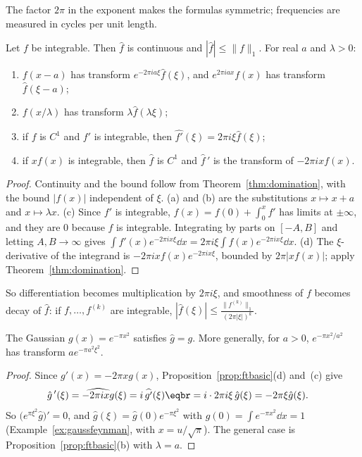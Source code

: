 The factor $2\pi$ in the exponent makes the formulas symmetric; frequencies are measured in cycles per unit length.

\begin{proposition}\label{prop:ftbasic}
Let $f$ be integrable. Then $\hat f$ is continuous and $|\hat f|\le\|f\|_1$. For real $a$ and $\lambda>0$:
\begin{enumerate}[label=(\alph*)]
\item $f(x-a)$ has transform $e^{-2\pi ia\xi}\hat f(\xi)$, and $e^{2\pi iax}f(x)$ has transform $\hat f(\xi-a)$;
\item $f(x/\lambda)$ has transform $\lambda\hat f(\lambda\xi)$;
\item if $f$ is $C^1$ and $f'$ is integrable, then $\widehat{f'}(\xi)=2\pi i\xi\hat f(\xi)$;
\item if $xf(x)$ is integrable, then $\hat f$ is $C^1$ and $\hat f\,'$ is the transform of $-2\pi ixf(x)$.
\end{enumerate}
\end{proposition}
\begin{proof}
Continuity and the bound follow from Theorem~\ref{thm:domination}, with the bound $|f(x)|$ independent of $\xi$. (a) and (b) are the
substitutions $x\mapsto x+a$ and $x\mapsto\lambda x$. (c) Since $f'$ is integrable, $f(x)=f(0)+\int_0^xf'$ has limits at $\pm\infty$, and they are $0$
because $f$ is integrable. Integrating by parts on $[-A,B]$ and letting $A,B\to\infty$ gives $\int f'(x)e^{-2\pi ix\xi}\dd x=2\pi i\xi\int f(x)e^{-2\pi ix\xi}\dd x$.
(d) The $\xi$-derivative of the integrand is $-2\pi ixf(x)e^{-2\pi ix\xi}$, bounded by $2\pi|xf(x)|$; apply Theorem~\ref{thm:domination}.
\end{proof}

So differentiation becomes multiplication by $2\pi i\xi$, and smoothness of $f$ becomes decay of $\hat f$: if $f,\dots,f^{(k)}$ are integrable,
$|\hat f(\xi)|\le\frac{\|f^{(k)}\|_1}{(2\pi|\xi|)^k}$.

\begin{theorem}\label{thm:gaussianft}
The Gaussian $g(x)=e^{-\pi x^2}$ satisfies $\hat g=g$. More generally, for $a>0$, $e^{-\pi x^2/a^2}$ has transform $ae^{-\pi a^2\xi^2}$.
\end{theorem}
\begin{proof}
Since $g'(x)=-2\pi xg(x)$, Proposition~\ref{prop:ftbasic}(d) and~(c) give
\[
\begin{aligned}\hat g\,'(\xi)&=\widehat{-2\pi ixg}(\xi)=i\,\widehat{g'}(\xi)\eqbr=i\cdot2\pi i\xi\,\hat g(\xi)=-2\pi\xi\hat g(\xi).\end{aligned}
\]
So $\bigl(e^{\pi\xi^2}\hat g\bigr)'=0$, and $\hat g(\xi)=\hat g(0)e^{-\pi\xi^2}$ with $\hat g(0)=\int e^{-\pi x^2}\dd x=1$ (Example~\ref{ex:gaussfeynman}, with $x=u/\sqrt\pi$). The general
case is Proposition~\ref{prop:ftbasic}(b) with $\lambda=a$.
\end{proof}

